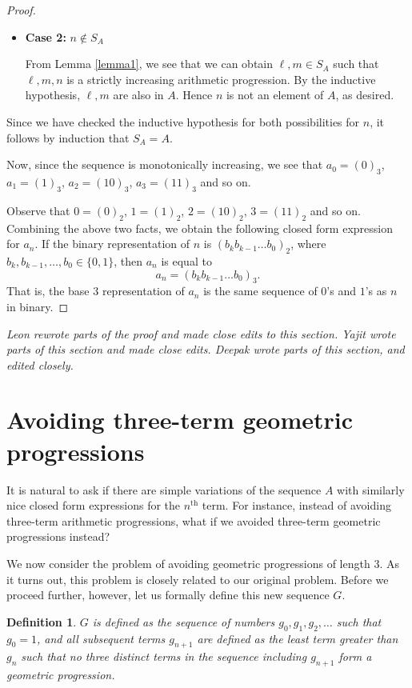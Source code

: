 \documentclass[11pt,letterpaper,twoside,english]{article}
\theoremstyle{theorem}
\newtheorem{definition}[theorem]{Definition}
\theoremstyle{remark}
\begin{document}
\begin{proof}
\begin{itemize}
\item \textbf{Case 2:} $n \not \in S_A$

From Lemma \ref{lemma1}, we see that we can obtain $\ell, m\in S_A$ such that $\ell, m, n$ is a strictly increasing arithmetic progression. By the inductive hypothesis, $\ell, m$ are also in $A$. Hence $n$ is not an element of $A$, as desired.
\end{itemize}

Since we have checked the inductive hypothesis for both possibilities for $n$, it follows by induction that $S_A=A$. 

Now, since the sequence is monotonically increasing, we see that $a_0 = (0)_3$, $a_1 = (1)_3$, $a_2 = (10)_3$, $a_3 = (11)_3$ and so on.

Observe that $0 = (0)_2$, $1 = (1)_2$, $2 = (10)_2$, $3 = (11)_2$ and so on. Combining the above two facts, we obtain the following closed form expression for $a_n$. If the binary representation of $n$ is $(b_k b_{k-1} \ldots b_0)_2$, where $b_k, b_{k-1}, \ldots, b_0 \in \{0, 1\}$, then $a_n$ is equal to
$$a_n = (b_k b_{k-1} \ldots b_0)_3.$$
That is, the base 3 representation of $a_n$ is the same sequence of $0$'s and $1$'s as $n$ in binary.

\end{proof}

\emph{Leon rewrote parts of the proof and made close edits to this section. Yajit wrote parts of this section and made close edits. Deepak wrote parts of this section, and edited closely.}
\section{Avoiding three-term geometric progressions} \label{sec:GP}

It is natural to ask if there are simple variations of the sequence $A$ with similarly nice closed form expressions for the $n^{\text{th}}$ term. For instance, instead of avoiding three-term arithmetic progressions, what if we avoided three-term geometric progressions instead? 

We now consider the problem of avoiding geometric progressions of length $3$. As it turns out, this problem is closely related to our original problem. Before we proceed further, however, let us formally define this new sequence $G$.

\begin{definition} \label{def:seqG}
$G$ is defined as the sequence of numbers $g_0, g_1, g_2, \ldots$ such that $g_0 = 1$, and all subsequent terms $g_{n+1}$ are defined as the least term greater than $g_n$ such that no three distinct terms in the sequence including $g_{n+1}$ form a geometric progression.
\end{definition}
\end{document}

